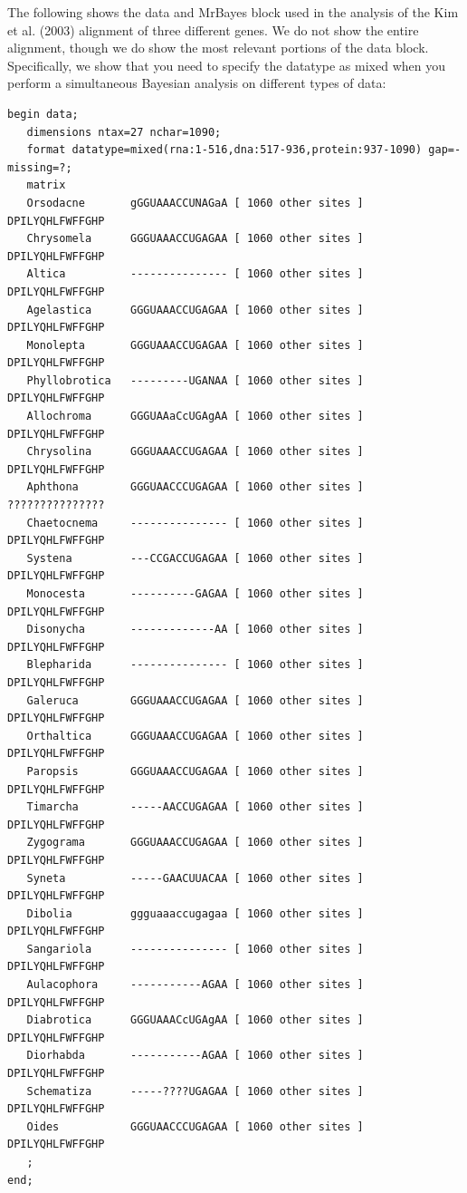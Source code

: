 \documentclass{svmult}
\begin{document}
 The following shows the data and MrBayes
block used in the analysis of the Kim et al. (2003) alignment of three different genes. We do not show the entire
alignment, though we do show the most relevant portions of the data block. Specifically, we show that you need to
specify the datatype as mixed when you perform a simultaneous Bayesian analysis on different types of data:
\scriptsize
\begin{verbatim}
begin data;
   dimensions ntax=27 nchar=1090;
   format datatype=mixed(rna:1-516,dna:517-936,protein:937-1090) gap=- missing=?;
   matrix
   Orsodacne       gGGUAAACCUNAGaA [ 1060 other sites ] DPILYQHLFWFFGHP
   Chrysomela      GGGUAAACCUGAGAA [ 1060 other sites ] DPILYQHLFWFFGHP
   Altica          --------------- [ 1060 other sites ] DPILYQHLFWFFGHP
   Agelastica      GGGUAAACCUGAGAA [ 1060 other sites ] DPILYQHLFWFFGHP
   Monolepta       GGGUAAACCUGAGAA [ 1060 other sites ] DPILYQHLFWFFGHP
   Phyllobrotica   ---------UGANAA [ 1060 other sites ] DPILYQHLFWFFGHP
   Allochroma      GGGUAAaCcUGAgAA [ 1060 other sites ] DPILYQHLFWFFGHP
   Chrysolina      GGGUAAACCUGAGAA [ 1060 other sites ] DPILYQHLFWFFGHP
   Aphthona        GGGUAACCCUGAGAA [ 1060 other sites ] ???????????????
   Chaetocnema     --------------- [ 1060 other sites ] DPILYQHLFWFFGHP
   Systena         ---CCGACCUGAGAA [ 1060 other sites ] DPILYQHLFWFFGHP
   Monocesta       ----------GAGAA [ 1060 other sites ] DPILYQHLFWFFGHP
   Disonycha       -------------AA [ 1060 other sites ] DPILYQHLFWFFGHP
   Blepharida      --------------- [ 1060 other sites ] DPILYQHLFWFFGHP
   Galeruca        GGGUAAACCUGAGAA [ 1060 other sites ] DPILYQHLFWFFGHP
   Orthaltica      GGGUAAACCUGAGAA [ 1060 other sites ] DPILYQHLFWFFGHP
   Paropsis        GGGUAAACCUGAGAA [ 1060 other sites ] DPILYQHLFWFFGHP
   Timarcha        -----AACCUGAGAA [ 1060 other sites ] DPILYQHLFWFFGHP
   Zygograma       GGGUAAACCUGAGAA [ 1060 other sites ] DPILYQHLFWFFGHP
   Syneta          -----GAACUUACAA [ 1060 other sites ] DPILYQHLFWFFGHP
   Dibolia         ggguaaaccugagaa [ 1060 other sites ] DPILYQHLFWFFGHP
   Sangariola      --------------- [ 1060 other sites ] DPILYQHLFWFFGHP
   Aulacophora     -----------AGAA [ 1060 other sites ] DPILYQHLFWFFGHP
   Diabrotica      GGGUAAACcUGAgAA [ 1060 other sites ] DPILYQHLFWFFGHP
   Diorhabda       -----------AGAA [ 1060 other sites ] DPILYQHLFWFFGHP
   Schematiza      -----????UGAGAA [ 1060 other sites ] DPILYQHLFWFFGHP
   Oides           GGGUAACCCUGAGAA [ 1060 other sites ] DPILYQHLFWFFGHP
   ;
end;


\end{verbatim}
\end{document}
